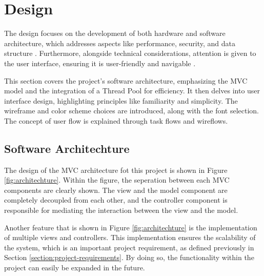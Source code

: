 \chapter{Design}
\label{chapter:design}

The design focuses on the development of both hardware and software architecture, which addresses aspects like performance, security, and data structure \cite{Hausen}. Furthermore, alongside technical considerations, attention is given to the user interface, ensuring it is user-friendly and navigable \cite{Hausen}.

This section covers the project's software architecture, emphasizing the MVC model and the integration of a Thread Pool for efficiency. It then delves into user interface design, highlighting principles like familiarity and simplicity. The wireframe and color scheme choices are introduced, along with the font selection. The concept of user flow is explained through task flows and wireflows.

\section{Software Architechture}
\label{sec:software-architechture}




The design of the MVC architecture fot this project is shown in Figure \ref{fig:architechture}. Within the figure, the seperation between each MVC components are clearly shown. The view and the model component are completely decoupled from each other, and the controller component is responsible for mediating the interaction between the view and the model.

Another feature that is shown in Figure \ref{fig:architechture} is the implementation of multiple views and controllers. This implementation ensures the scalability of the system, which is an important project requirement, as defined previously in Section \ref{section:project-requirements}. By doing so, the functionality within the project can easily be expanded in the future.

